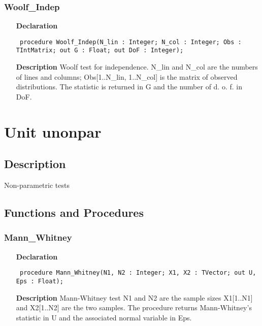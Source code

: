 \documentclass[12pt,a4paper,oneside]{report}
\newcommand{\declarationitem}[1]{\textbf{#1}}
\newcommand{\descriptiontitle}[1]{\textbf{#1}}
\newcommand{\code}[1]{\texttt{#1}}
\begin{document}
\subsubsection{Woolf{\_}Indep}
\label{uwoolf-Woolf_Indep}
\begin{itemize}\item[\declarationitem{Declaration}\hfill]
	\begin{flushleft}
		\code{
			procedure Woolf{\_}Indep(N{\_}lin : Integer; N{\_}col : Integer; Obs : TIntMatrix; out G : Float; out DoF : Integer);}
	\end{flushleft}
	\item[\descriptiontitle{Description}]
	Woolf test for independence. N{\_}lin and N{\_}col are the numbers of lines and columns; Obs[1..N{\_}lin, 1..N{\_}col] is the matrix of observed distributions. The statistic is returned in G and the number of d. o. f. in DoF.
\end{itemize}
\section{Unit unonpar}
\label{unonpar}
\subsection{Description}
Non{-}parametric tests
\subsection{Functions and Procedures}
\subsubsection{Mann{\_}Whitney}
\label{unonpar-Mann_Whitney}
\begin{itemize}\item[\declarationitem{Declaration}\hfill]
	\begin{flushleft}
		\code{
			procedure Mann{\_}Whitney(N1, N2 : Integer; X1, X2 : TVector; out U, Eps : Float);}
	\end{flushleft}
	\item[\descriptiontitle{Description}]
	Mann{-}Whitney test N1 and N2 are the sample sizes X1[1..N1] and X2[1..N2] are the two samples. The procedure returns Mann{-}Whitney's statistic in U and the associated normal variable in Eps.
\end{itemize}
\end{document}
